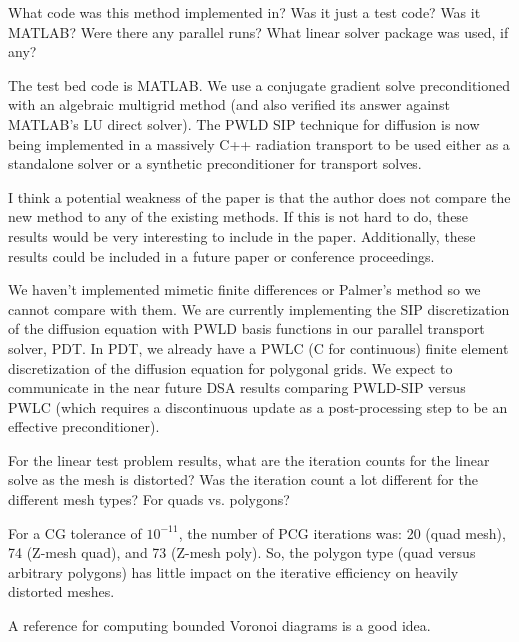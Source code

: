 \documentclass{article}
\begin{document}
\bigskip

{
\color{blue}
What code was this method implemented in? Was it just a test code? Was it MATLAB? Were there any
parallel runs? What linear solver package was used, if any?
}

The test bed code is MATLAB. We use a conjugate gradient solve
preconditioned with an algebraic multigrid method (and also verified its answer against MATLAB's LU direct solver). 
The PWLD SIP technique for diffusion is now being 
implemented in a massively C++ radiation transport to be used either as a standalone solver or a 
synthetic preconditioner for transport solves. 



\bigskip


{
\color{blue}
I think a potential weakness of the paper is that the author does not compare the new method to any of
the existing methods. If this is not hard to do, these results would be very interesting to include in the
paper. Additionally, these results could be included in a future paper or conference proceedings.
}

We haven't implemented mimetic finite differences or Palmer's method so we cannot compare with them. We are
currently implementing the SIP discretization of the diffusion equation with PWLD basis functions 
in our parallel transport solver, PDT.  In PDT, we already have a PWLC (C for continuous)
finite element discretization of the diffusion equation for polygonal grids. We expect to communicate in the near
future DSA results comparing PWLD-SIP versus PWLC (which requires a discontinuous update as a post-processing step to
be an effective preconditioner).
 \bigskip


{
\color{blue}
For the linear test problem results, what are the iteration counts for the linear solve as the mesh is
distorted? Was the iteration count a lot different for the different mesh types? For quads vs. polygons?
}


For a CG tolerance of $10^{-11}$, the number of PCG iterations was: 20 (quad mesh),
74 (Z-mesh quad), and 73 (Z-mesh poly). So, the polygon type (quad versus arbitrary polygons) has little impact on
the iterative efficiency on heavily distorted meshes.
\bigskip


{
\color{blue}
A reference for computing bounded Voronoi diagrams is a good idea.
}
\end{document}
